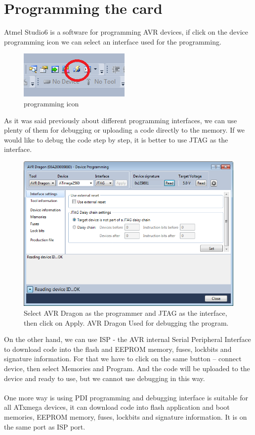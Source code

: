\documentclass[english]{article}
\begin{document}
\section{Programming the card}
Atmel Studio6 is a software for programming AVR devices, if click on the device programming icon we can select an interface used for the programming. 
 \begin{figure}[H]
\centerline{\includegraphics[scale=0.8]{MicroLab2/image014}}
\caption{programming icon}
\end{figure}
As it was said previously about different programming interfaces, we can use plenty of them for debugging or uploading a code directly to the memory. If we would like to debug the code step by step, it is better to use JTAG as the interface.
 \begin{figure}[H]
\centerline{\includegraphics[scale=0.5]{MicroLab2/image015}}
\caption{Select AVR Dragon as the programmer and JTAG as the interface, then click on Apply. AVR Dragon Used for debugging the program.}
\end{figure}
On the other hand, we can use ISP - the AVR internal Serial Peripheral Interface to download code into the flash and EEPROM memory, fuses, lockbits and signature information. For that we have to click on the same button – connect device, then select Memories and Program. And the code will be uploaded to the device and ready to use, but we cannot use debugging in this way.\\\\
One more way is using PDI programming and debugging interface is suitable for all ATxmega devices, it can download code into flash application and boot memories, EEPROM memory, fuses, lockbits and signature information. It is on the same port as ISP port.
\end{document}

